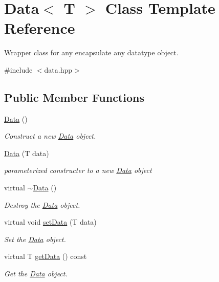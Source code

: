 \hypertarget{classData}{}\section{Data$<$ T $>$ Class Template Reference}
\label{classData}


Wrapper class for any encapsulate any datatype object.  




{\ttfamily \#include $<$data.\+hpp$>$}

\subsection*{Public Member Functions}
\begin{DoxyCompactItemize}
\item 
\mbox{\label{classData_ab37beb31b788e0c806211af241b86bba}} 
\hyperlink{classData_ab37beb31b788e0c806211af241b86bba}{Data} ()
\begin{DoxyCompactList}\small\item\em Construct a new \hyperlink{classData}{Data} object. \end{DoxyCompactList}\item 
\hyperlink{classData_aeaaa183d93a880175aa4775525cd6165}{Data} (T data)
\begin{DoxyCompactList}\small\item\em parameterized constructer to a new \hyperlink{classData}{Data} object \end{DoxyCompactList}\item 
\mbox{\label{classData_aa5e287f616f4982a7cb75b99bd2eb248}} 
virtual \hyperlink{classData_aa5e287f616f4982a7cb75b99bd2eb248}{$\sim$\+Data} ()
\begin{DoxyCompactList}\small\item\em Destroy the \hyperlink{classData}{Data} object. \end{DoxyCompactList}\item 
virtual void \hyperlink{classData_a08197cc91bb861231a63f409e6b60f44}{set\+Data} (T data)
\begin{DoxyCompactList}\small\item\em Set the \hyperlink{classData}{Data} object. \end{DoxyCompactList}\item 
virtual T \hyperlink{classData_a1c956c4d07da4ff318f17811254ec7e5}{get\+Data} () const
\begin{DoxyCompactList}\small\item\em Get the \hyperlink{classData}{Data} object. \end{DoxyCompactList}\end{DoxyCompactItemize}


